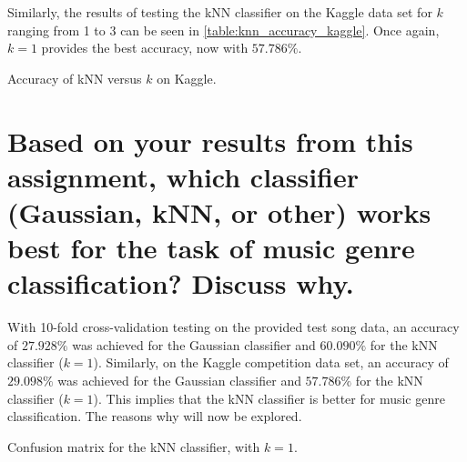\documentclass[a4paper,titlepage]{article}
\begin{document}
	Similarly, the results of testing the kNN classifier on the Kaggle data set for $k$ ranging from 1 to 3 can be seen in \cref{table:knn_accuracy_kaggle}. Once again, $k=1$ provides the best accuracy, now with $57.786\%$.
	
	\begin{table}[!htb]
		\centering
		\caption{Accuracy of kNN versus $k$ on Kaggle.}
		\label{table:knn_accuracy_kaggle}
	\end{table}
	
	
	\section{Based on your results from this assignment, which classifier (Gaussian, kNN, or other) works best for the task of music genre classification? Discuss why.}
	
	With 10-fold cross-validation testing on the provided test song data, an accuracy of $27.928\%$ was achieved for the Gaussian classifier and $60.090\%$ for the kNN classifier ($k = 1$). Similarly, on the Kaggle competition data set, an accuracy of $29.098\%$ was achieved for the Gaussian classifier and $57.786\%$ for the kNN classifier ($k = 1$). This implies that the kNN classifier is better for music genre classification. The reasons why will now be explored.
	
	\begin{table}[!htb]
		\centering
		\caption{Confusion matrix for the kNN classifier, with $k = 1$.}
		\label{table:confusion_knn_1}
	\end{table}
\end{document}
